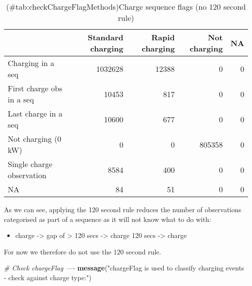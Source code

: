 \documentclass[]{article}
\newenvironment{Shaded}{\begin{snugshade}}{\end{snugshade}}
\newcommand{\CommentTok}[1]{\textcolor[rgb]{0.56,0.35,0.01}{\textit{#1}}}
\newcommand{\DataTypeTok}[1]{\textcolor[rgb]{0.13,0.29,0.53}{#1}}
\newcommand{\KeywordTok}[1]{\textcolor[rgb]{0.13,0.29,0.53}{\textbf{#1}}}
\newcommand{\NormalTok}[1]{#1}
\newcommand{\OperatorTok}[1]{\textcolor[rgb]{0.81,0.36,0.00}{\textbf{#1}}}
\newcommand{\StringTok}[1]{\textcolor[rgb]{0.31,0.60,0.02}{#1}}
\providecommand{\tightlist}{%
  \setlength{\itemsep}{0pt}\setlength{\parskip}{0pt}}
\begin{document}
\begin{Shaded}
\end{Shaded}

\begin{table}[t]

\caption{(\#tab:checkChargeFlagMethods)Charge sequence flags (no 120 second rule)}
\centering
\begin{tabular}{l|r|r|r|r}
\hline
  & Standard charging & Rapid charging & Not charging & NA\\
\hline
Charging in a seq & 1032628 & 12388 & 0 & 0\\
\hline
First charge obs in a seq & 10453 & 817 & 0 & 0\\
\hline
Last charge in a seq & 10600 & 677 & 0 & 0\\
\hline
Not charging (0 kW) & 0 & 0 & 805358 & 0\\
\hline
Single charge observation & 8584 & 400 & 0 & 0\\
\hline
NA & 84 & 51 & 0 & 0\\
\hline
\end{tabular}
\end{table}

As we can see, applying the 120 second rule reduces the number of observations categorised as part of a sequence as it will not know what to do with:

\begin{itemize}
\tightlist
\item
  charge -\textgreater{} gap of \textgreater{} 120 secs -\textgreater{} charge 120 secs -\textgreater{} charge
\end{itemize}

For now we therefore do not use the 120 second rule.

\begin{Shaded}
\begin{Highlighting}[]
\CommentTok{# Check chargeFlag ----}
\KeywordTok{message}\NormalTok{(}\StringTok{"chargeFlag is used to classify charging events - check against charge type:"}\NormalTok{)}
\end{Highlighting}
\end{Shaded}
\end{document}
